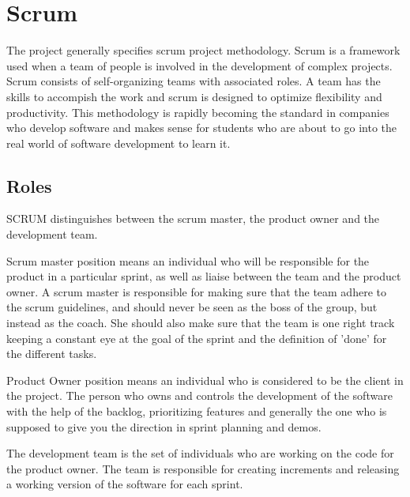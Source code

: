 \section{Scrum}
The project generally specifies scrum project methodology. Scrum is a framework used when a team of people is involved in the development of complex projects. Scrum consists of self-organizing teams with associated roles. A team has the skills to accompish the work and scrum is designed to optimize flexibility and productivity. This methodology is rapidly becoming the standard in companies who develop software and makes sense for students who are about to go into the real world of software development to learn it. 

\subsection{Roles}

SCRUM distinguishes between the scrum master, the product owner and the development team.

Scrum master position means an individual who will be responsible for the product in a
particular sprint, as well as liaise between the team and the product owner.
A scrum master is responsible for making sure that the team adhere to the scrum guidelines,
and should never be seen as the boss of the group, but instead as the coach.
She should also make sure that the team is one right track keeping a constant eye at the goal
of the sprint and the definition of 'done' for the different tasks.

Product Owner position means an individual who is considered to be the client in the project.
The person who owns and controls the development of the software with the help of the backlog,
prioritizing features and generally the one who is supposed to give you the direction in sprint planning and demos.

The development team is the set of individuals who are working on the code for the product owner.
The team is responsible for creating increments and releasing a working version of the software
for each sprint.

